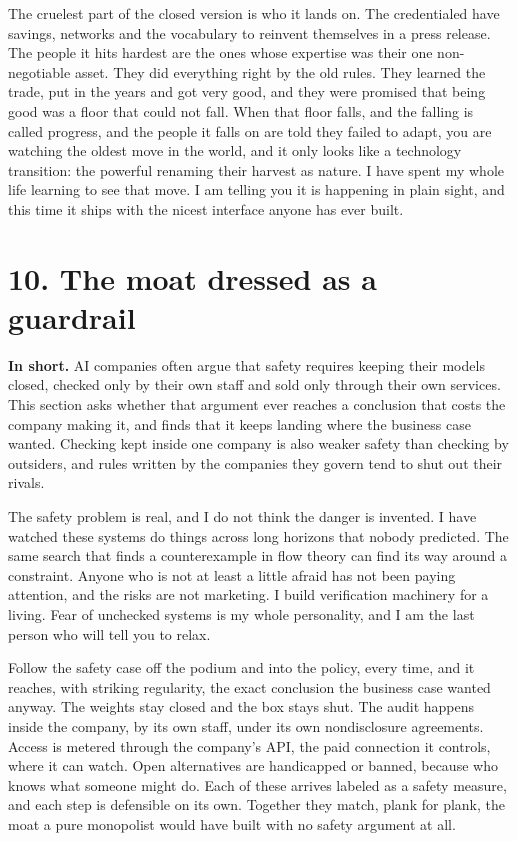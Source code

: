 \documentclass[11pt]{article}
\begin{document}
The cruelest part of the closed version is who it lands on. The credentialed have savings, networks and the vocabulary to reinvent themselves in a press release. The people it hits hardest are the ones whose expertise was their one non-negotiable asset. They did everything right by the old rules. They learned the trade, put in the years and got very good, and they were promised that being good was a floor that could not fall. When that floor falls, and the falling is called progress, and the people it falls on are told they failed to adapt, you are watching the oldest move in the world, and it only looks like a technology transition: the powerful renaming their harvest as nature. I have spent my whole life learning to see that move. I am telling you it is happening in plain sight, and this time it ships with the nicest interface anyone has ever built.

\section*{10. The moat dressed as a guardrail}

\textbf{In short.} AI companies often argue that safety requires keeping their models closed, checked only by their own staff and sold only through their own services. This section asks whether that argument ever reaches a conclusion that costs the company making it, and finds that it keeps landing where the business case wanted. Checking kept inside one company is also weaker safety than checking by outsiders, and rules written by the companies they govern tend to shut out their rivals.

The safety problem is real, and I do not think the danger is invented. I have watched these systems do things across long horizons that nobody predicted. The same search that finds a counterexample in flow theory can find its way around a constraint. Anyone who is not at least a little afraid has not been paying attention, and the risks are not marketing. I build verification machinery for a living. Fear of unchecked systems is my whole personality, and I am the last person who will tell you to relax.

Follow the safety case off the podium and into the policy, every time, and it reaches, with striking regularity, the exact conclusion the business case wanted anyway. The weights stay closed and the box stays shut. The audit happens inside the company, by its own staff, under its own nondisclosure agreements. Access is metered through the company's API, the paid connection it controls, where it can watch. Open alternatives are handicapped or banned, because who knows what someone might do. Each of these arrives labeled as a safety measure, and each step is defensible on its own. Together they match, plank for plank, the moat a pure monopolist would have built with no safety argument at all.
\end{document}
